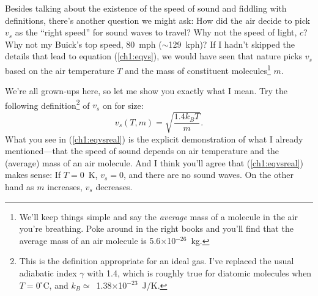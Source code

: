 Besides talking about the existence of the speed of sound and fiddling with
definitions, there's another question we might ask: How did the air decide to
pick $v_s$ as the ``right speed'' for sound waves to travel? Why not the speed
of light, $c$? Why not my Buick's top speed, 80~mph ($\sim$129~kph)? If I hadn't
skipped the details that lead to equation (\ref{ch1:eqvs}), we would have seen
that nature picks $v_s$ based on the air temperature $T$ and the mass of
constituent molecules\footnote{We'll keep things simple and say the
  \emph{average} mass of a molecule in the air you're breathing. Poke around in
  the right books and you'll find that the average mass of an air molecule is
  5.6$\times$10$^{-26}$~kg.} $m$.

We're all grown-ups here, so let me show you exactly what I mean. Try
the following definition\footnote{This is the definition appropriate for an
  ideal gas. I've replaced the usual adiabatic index $\gamma$ with 1.4, which is
  roughly true for diatomic molecules when $T = 0 ^{\circ}$C, and
  $k_B \simeq$~1.38$\times$10$^{-23}$~J/K.} of $v_s$ on for size:
\begin{equation}
  \label{ch1:eqvsreal}
  v_s (T,m) = \sqrt{\dfrac{1.4 k_B T}{m}}.
\end{equation}
What you see in (\ref{ch1:eqvsreal}) is the explicit demonstration of what I
already mentioned---that the speed of sound depends on air temperature and the
(average) mass of an air molecule. And I think you'll agree that
(\ref{ch1:eqvsreal}) makes sense: If $T = 0$~K, $v_s = 0$, and there are no
sound waves. On the other hand as $m$ increases, $v_s$ decreases.

